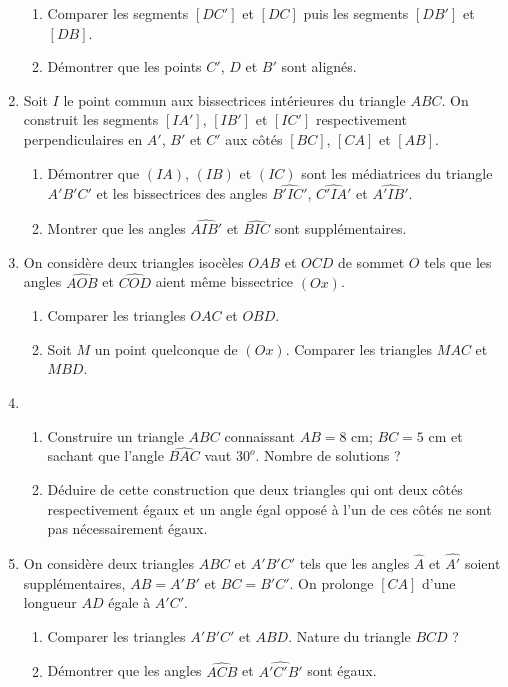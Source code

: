 \begin{enumerate}
\begin{enumerate}
 \item Comparer les segments $[DC']$ et $[DC]$ puis les segments $[DB']$ et $[DB]$.
 \item Démontrer que les points $C'$, $D$ et $B'$ sont alignés.
 \end{enumerate}
 \item Soit $I$ le point commun aux bissectrices intérieures du triangle $ABC$. 
 On construit les segments $[IA']$, $[IB']$ et $[IC']$ respectivement perpendiculaires en $A'$, $B'$ et $C'$ aux côtés $[BC]$, $[CA]$ et $[AB]$. 
 \begin{enumerate}
 \item Démontrer que $(IA)$, $(IB)$ et $(IC)$ sont les médiatrices du triangle $A'B'C'$ et les bissectrices des angles $\widehat{B'IC'}$, $\widehat{C'IA'}$ et
 $\widehat{A'IB'}$.
 \item Montrer que les angles $\widehat{AIB'}$ et $\widehat{BIC}$ sont supplémentaires.
 \end{enumerate}
 \item On considère deux triangles isocèles $OAB$ et $OCD$ de sommet $O$ tels que les angles $\widehat{AOB}$ et $\widehat{COD}$ aient même bissectrice $(Ox)$. \begin{enumerate}
 \item Comparer les triangles $OAC$ et $OBD$. 
 \item Soit $M$ un point quelconque de $(Ox)$. Comparer les triangles $MAC$ et $MBD$.
 \end{enumerate}
 \item\begin{enumerate}
 \item Construire un triangle $ABC$ connaissant $AB= 8$ cm; $BC= 5$ cm et sachant que l'angle $\widehat{BAC}$ vaut $30^o$. Nombre de solutions ?
 \item Déduire de cette construction que deux triangles qui ont deux côtés respectivement égaux et un angle égal opposé à l'un de ces côtés ne sont pas nécessairement égaux.
\end{enumerate}  
\item On considère deux triangles $ABC$ et $A'B'C'$ tels que les angles $\widehat{A}$ et $\widehat{A'}$ soient supplémentaires, $AB=A'B'$ et $BC=B'C'$. On prolonge $[CA]$
d'une longueur $AD$ égale à $A'C'$.\begin{enumerate}
\item Comparer les triangles $A'B'C'$ et $ABD$. Nature du triangle $BCD$ ? 
\item Démontrer que les angles $\widehat{ACB}$ et $\widehat{A'C'B'}$ sont égaux.

\end{enumerate}
\end{enumerate}
